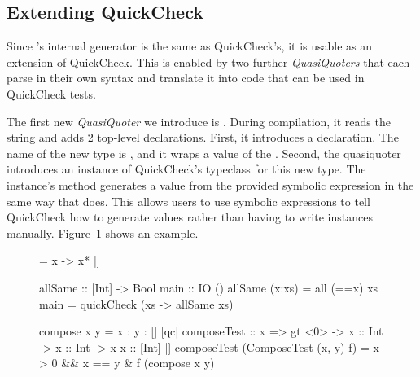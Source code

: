 \subsection{Extending QuickCheck}
\par Since \ourDSL's internal generator is the same as QuickCheck's, it is usable as an
    extension of QuickCheck. This is enabled by two further \textit{QuasiQuoters} that
    each parse in their own syntax and translate it into code that can be used in QuickCheck tests.

\par The first new \textit{QuasiQuoter} we introduce is \hskin{[arb| <constructor> <type> = <symbolic expression> |]}.
    During compilation, it reads the string and adds 2 top-level declarations. First, it introduces a 
    declaration. The name of the new type is , and it wraps a value of the . Second, the quasiquoter
    introduces
    an instance of QuickCheck's  typeclass for this new type. The instance's  method generates 
    a value from the provided symbolic expression in the same way that \ourDSL does.
    This allows users to use symbolic expressions to tell QuickCheck how to generate values rather than having to write 
    instances manually.
    Figure~\ref{fig:arb-qq} shows an example.

\begin{figure}
    \begin{smallhskcode}
[arb| SameElem [Int] = x -> x* |]

allSame :: [Int] -> Bool            main :: IO ()
allSame (x:xs) = all (==x) xs       main = quickCheck (\SameElem xs -> allSame xs)
    \end{smallhskcode}
    \caption{}
    \label{fig:arb-qq}
\end{figure}

\begin{figure}
    \begin{smallhskcode}
compose x y = x : y : []
[qc| composeTest :: {x => gt <0>} -> x :: Int -> x :: Int -> x x :: [Int] |]
composeTest (ComposeTest (x, y) f) = x > 0 && x == y & f (compose x y)
    \end{smallhskcode}
    \caption{}
    \label{fig:qc-qq}
\end{figure}

